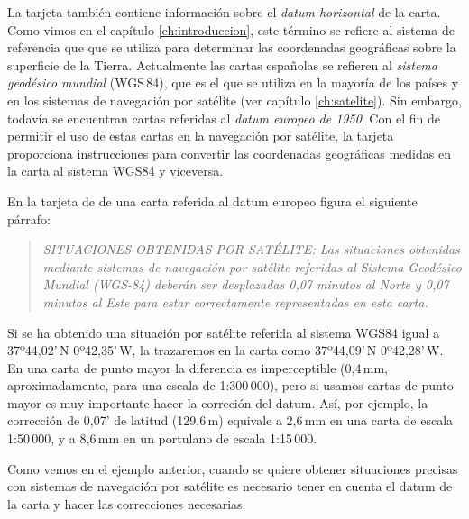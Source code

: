 La tarjeta también contiene información sobre el \emph{datum horizontal} de la carta. Como 
vimos en el capítulo \ref{ch:introduccion}, este término se refiere al sistema de referencia que 
que se utiliza para determinar las coordenadas geográficas sobre la superficie de la Tierra. 
Actualmente las cartas españolas se refieren al \emph{sistema geodésico mundial} (WGS\,84), 
que es el que se utiliza en la mayoría de los países y 
en los sistemas de navegación por satélite  (ver capítulo \ref{ch:satelite}). Sin embargo, todavía se encuentran cartas referidas al  \emph{datum europeo de 1950}. Con el fin de permitir el uso de estas cartas en la navegación por satélite, la tarjeta proporciona instrucciones para convertir las coordenadas geográficas medidas en la carta al sistema WGS84 y 
viceversa. 


\begin{ejemplo}
En la tarjeta de de una carta referida al datum europeo %
figura el siguiente párrafo: 
\begin{quotation}\noindent\itshape\color{darkblue}
SITUACIONES OBTENIDAS POR SATÉLITE: Las situaciones obtenidas mediante sistemas 
de navegación por satélite referidas al Sistema Geodésico Mundial (WGS-84) deberán ser 
desplazadas 0,07 minutos al Norte y 0,07 minutos al Este para estar correctamente representadas en esta carta. 
\end{quotation}
Si se ha obtenido una situación por satélite referida al sistema WGS84 igual a 37º44,02’\,N
0º42,35’\,W, la trazaremos en la carta como 37º44,09’\,N 0º42,28’\,W. En una carta de punto mayor
la diferencia es imperceptible (0,4\,mm, aproximadamente, para una escala de 1:300\,000), pero si usamos cartas de 
punto mayor es muy importante hacer la correción del datum. Así, por ejemplo, la corrección de 0,07’ 
de latitud (129,6\,m) equivale a 2,6\,mm en una carta de escala 1:50\,000, y a 8,6\,mm en un portulano de escala
 1:15\,000.
\end{ejemplo}

Como vemos en el ejemplo anterior, cuando se quiere obtener situaciones precisas con 
sistemas de navegación por satélite es necesario tener en cuenta el datum de la carta y 
hacer las correcciones necesarias. 

